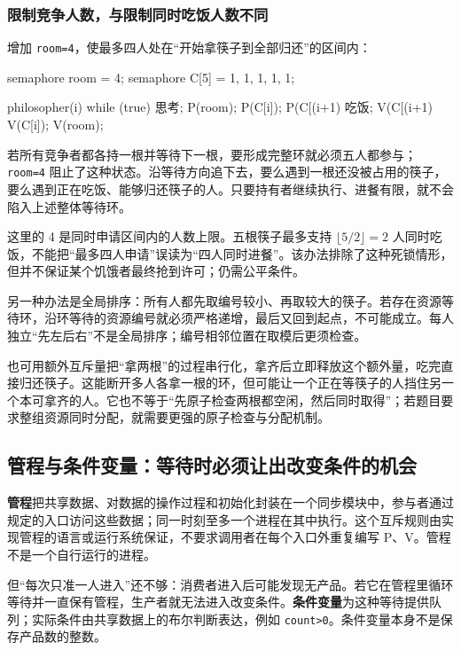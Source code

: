 \subsubsection{限制竞争人数，与限制同时吃饭人数不同}\label{OS02-auto-19}

增加 \texttt{room=\allowbreak{}4}，使最多四人处在``开始拿筷子到全部归还''的区间内：

\begin{codeblock}[language={}]
semaphore room = 4;
semaphore C[5] = {1, 1, 1, 1, 1};

philosopher(i) {
    while (true) {
        思考;
        P(room);
        P(C[i]);
        P(C[(i+1) %
        吃饭;
        V(C[(i+1) %
        V(C[i]);
        V(room);
    }
}
\end{codeblock}

若所有竞争者都各持一根并等待下一根，要形成完整环就必须五人都参与；\texttt{room=\allowbreak{}4} 阻止了这种状态。沿等待方向追下去，要么遇到一根还没被占用的筷子，要么遇到正在吃饭、能够归还筷子的人。只要持有者继续执行、进餐有限，就不会陷入上述整体等待环。

这里的 4 是同时申请区间内的人数上限。五根筷子最多支持 \(\lfloor5/2\rfloor=2\) 人同时吃饭，不能把``最多四人申请''误读为``四人同时进餐''。该办法排除了这种死锁情形，但并不保证某个饥饿者最终抢到许可；仍需公平条件。

另一种办法是全局排序：所有人都先取编号较小、再取较大的筷子。若存在资源等待环，沿环等待的资源编号就必须严格递增，最后又回到起点，不可能成立。每人独立``先左后右''不是全局排序；编号相邻位置在取模后更须检查。

也可用额外互斥量把``拿两根''的过程串行化，拿齐后立即释放这个额外量，吃完直接归还筷子。这能断开多人各拿一根的环，但可能让一个正在等筷子的人挡住另一个本可拿齐的人。它也不等于``先原子检查两根都空闲，然后同时取得''；若题目要求整组资源同时分配，就需要更强的原子检查与分配机制。

\subsection{管程与条件变量：等待时必须让出改变条件的机会}\label{OS02-monitor}

\textbf{管程}把共享数据、对数据的操作过程和初始化封装在一个同步模块中，参与者通过规定的入口访问这些数据；同一时刻至多一个进程在其中执行。这个互斥规则由实现管程的语言或运行系统保证，不要求调用者在每个入口外重复编写 P、V。管程不是一个自行运行的进程。

但``每次只准一人进入''还不够：消费者进入后可能发现无产品。若它在管程里循环等待并一直保有管程，生产者就无法进入改变条件。\textbf{条件变量}为这种等待提供队列；实际条件由共享数据上的布尔判断表达，例如 \texttt{count>\allowbreak{}0}。条件变量本身不是保存产品数的整数。

